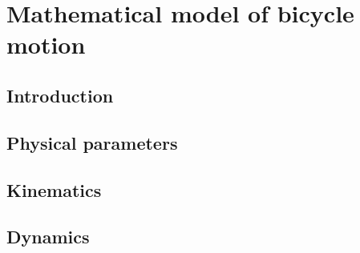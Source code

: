 \chapter{Mathematical model of bicycle motion}

\section{Introduction}

\section{Physical parameters}

\section{Kinematics}

\section{Dynamics}

